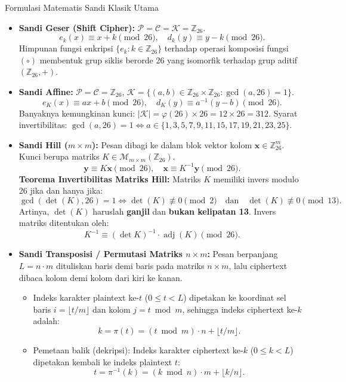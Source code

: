 \documentclass[11pt,a4paper]{article}
\begin{document}
\begin{teoribox}{Formulasi Matematis Sandi Klasik Utama}
\begin{itemize}[leftmargin=*]
    \item \textbf{Sandi Geser (Shift Cipher):} $\mathcal{P} = \mathcal{C} = \mathcal{K} = \mathbb{Z}_{26}$.
    \[
    e_k(x) \equiv x + k \pmod{26}, \quad d_k(y) \equiv y - k \pmod{26}.
    \]
    Himpunan fungsi enkripsi $\{e_k : k \in \mathbb{Z}_{26}\}$ terhadap operasi komposisi fungsi $(\circ)$ membentuk grup siklis berorde 26 yang isomorfik terhadap grup aditif $(\mathbb{Z}_{26}, +)$.
    
    \item \textbf{Sandi Affine:} $\mathcal{P} = \mathcal{C} = \mathbb{Z}_{26}$, $\mathcal{K} = \{(a, b) \in \mathbb{Z}_{26} \times \mathbb{Z}_{26} : \gcd(a, 26) = 1\}$.
    \[
    e_K(x) \equiv ax + b \pmod{26}, \quad d_K(y) \equiv a^{-1}(y - b) \pmod{26}.
    \]
    Banyaknya kemungkinan kunci: $|\mathcal{K}| = \varphi(26) \times 26 = 12 \times 26 = 312$.
    Syarat invertibilitas: $\gcd(a, 26) = 1 \iff a \in \{1, 3, 5, 7, 9, 11, 15, 17, 19, 21, 23, 25\}$.
    
    \item \textbf{Sandi Hill ($m \times m$):} Pesan dibagi ke dalam blok vektor kolom $\mathbf{x} \in \mathbb{Z}_{26}^m$. Kunci berupa matriks $K \in \mathcal{M}_{m \times m}(\mathbb{Z}_{26})$.
    \[
    \mathbf{y} \equiv K \mathbf{x} \pmod{26}, \quad \mathbf{x} \equiv K^{-1} \mathbf{y} \pmod{26}.
    \]
    \textbf{Teorema Invertibilitas Matriks Hill:} Matriks $K$ memiliki invers modulo 26 jika dan hanya jika:
    \[
    \gcd(\det(K), 26) = 1 \iff \det(K) \not\equiv 0 \pmod 2 \quad \text{dan} \quad \det(K) \not\equiv 0 \pmod{13}.
    \]
    Artinya, $\det(K)$ haruslah \textbf{ganjil} dan \textbf{bukan kelipatan 13}. Invers matriks ditentukan oleh:
    \[
    K^{-1} \equiv (\det K)^{-1} \cdot \operatorname{adj}(K) \pmod{26}.
    \]
    
    \item \textbf{Sandi Transposisi / Permutasi Matriks $n \times m$:} Pesan berpanjang $L = n \cdot m$ dituliskan baris demi baris pada matriks $n \times m$, lalu ciphertext dibaca kolom demi kolom dari kiri ke kanan.
    \begin{itemize}
        \item Indeks karakter plaintext ke-$t$ ($0 \le t < L$) dipetakan ke koordinat sel baris $i = \lfloor t/m \rfloor$ dan kolom $j = t \bmod m$, sehingga indeks ciphertext ke-$k$ adalah:
        \[
        k = \pi(t) = (t \bmod m) \cdot n + \lfloor t/m \rfloor.
        \]
        \item Pemetaan balik (dekripsi): Indeks karakter ciphertext ke-$k$ ($0 \le k < L$) dipetakan kembali ke indeks plaintext $t$:
        \[
        t = \pi^{-1}(k) = (k \bmod n) \cdot m + \lfloor k/n \rfloor.
        \]
    \end{itemize}
    

\end{itemize}
\end{teoribox}
\end{document}
